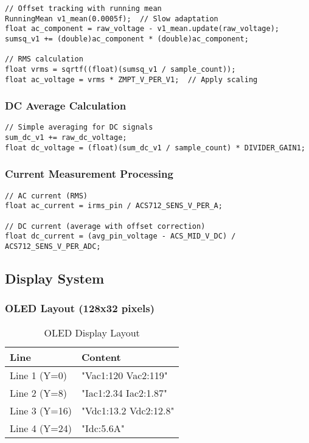 \documentclass[11pt,a4paper]{article}
\begin{document}
\begin{lstlisting}[caption=RMS Calculation for AC Signals]
// Offset tracking with running mean
RunningMean v1_mean(0.0005f);  // Slow adaptation
float ac_component = raw_voltage - v1_mean.update(raw_voltage);
sumsq_v1 += (double)ac_component * (double)ac_component;

// RMS calculation
float vrms = sqrtf((float)(sumsq_v1 / sample_count));
float ac_voltage = vrms * ZMPT_V_PER_V1;  // Apply scaling
\end{lstlisting}

\subsubsection{DC Average Calculation}

\begin{lstlisting}[caption=DC Average Calculation]
// Simple averaging for DC signals
sum_dc_v1 += raw_dc_voltage;
float dc_voltage = (float)(sum_dc_v1 / sample_count) * DIVIDER_GAIN1;
\end{lstlisting}

\subsubsection{Current Measurement Processing}

\begin{lstlisting}[caption=Current Measurement Processing]
// AC current (RMS)
float ac_current = irms_pin / ACS712_SENS_V_PER_A;

// DC current (average with offset correction)
float dc_current = (avg_pin_voltage - ACS_MID_V_DC) / ACS712_SENS_V_PER_ADC;
\end{lstlisting}

\subsection{Display System}

\subsubsection{OLED Layout (128x32 pixels)}

\begin{table}[H]
\centering
\begin{tabular}{@{}ll@{}}
\toprule
Line & Content \\ \midrule
Line 1 (Y=0) & "Vac1:120  Vac2:119" \\
Line 2 (Y=8) & "Iac1:2.34  Iac2:1.87" \\
Line 3 (Y=16) & "Vdc1:13.2 Vdc2:12.8" \\
Line 4 (Y=24) & "Idc:5.6A" \\ \bottomrule
\end{tabular}
\caption{OLED Display Layout}
\end{table}
\end{document}
